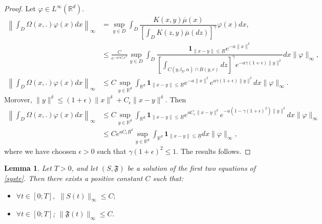 \documentclass[notitlepage,reqno,11pt]{amsart}
\numberwithin{equation}{section}
\newtheorem{lemma}{Lemma}[section]
\def\R{\mathbb{R}}
\begin{document}
\begin{proof}
Let $\varphi \in L^{\infty} (\mathbb{R}^d)$.
\begin{align*}
\left\|\int_{D} \Omega(x,.)\varphi(x)dx\right\|_{\infty}&=\sup_{y\in D} \int_{D}\dfrac{K(x,y)\overline{\mu}(x)}{\left[\displaystyle\int_{D}K(z,y)\overline{\mu}(dz) \right]^{\gamma}}\varphi(x)dx,\\
&\leq \frac{C}{e^{-a\gamma C_\epsilon r^{\delta}}}\sup_{y\in D}\int_{D}  \dfrac{\mathbf{1}_{\|x-y\|\leq \underline{R}}e^{-a\|x\|^{\delta}}}{\left[\displaystyle\int_{C(y,l_y,\alpha)\cap B(y,r)}dz\right]^{\gamma}e^{-a\gamma (1+\epsilon)\|y\|^{\delta}}}dx\|\varphi\|_{\infty},\\
\left\|\int_{D} \Omega(x,.)\varphi(x)dx\right\|_{\infty}&\leq C\sup_{y\in \R^d}\int_{\R^d}  \mathbf{1}_{\|x-y\|\leq \underline{R}}e^{-a\|x\|^{\delta}}e^{a\gamma (1+\epsilon)\|y\|^{\delta}}dx\|\varphi\|_{\infty}.
\end{align*}
Morover, $\|y\|^{\delta} \leq  (1+\epsilon) \|x\|^{\delta} + C_{\epsilon}\|x-y\|^{\delta}$. Then
\begin{align*}
\left\|\int_{D} \Omega(x,.)\varphi(x)dx\right\|_{\infty}&\leq C\sup_{y\in \R^d}\int_{\R^d}  \mathbf{1}_{\|x-y\|\leq \underline{R}}e^{aC_{\epsilon}\|x-y\|^{\delta}}e^{-a\left(1-\gamma (1+\epsilon)^2\right)\|y\|^{\delta}} dx\|\varphi\|_{\infty}\\
&\leq Ce^{aC_{\epsilon}\underline{R}^{\delta}}\sup_{y\in \R^d}  \int_{\R^d} \mathbf{1}_{\|x-y\|\leq \underline{R}}dx\|\varphi\|_{\infty},
\end{align*}
where we have choosen $\epsilon>0$ such that $\gamma(1+\epsilon)^2\leq 1$. The results follows.
\end{proof}
\begin{lemma}
	\label{lem3}
	Let $T>0$, and let $(S,\mathfrak{F} )$  be a solution of the first two equations of \eqref{syste}. Then there exists a positive constant $C$ such that:
	\begin{itemize}
		\item $\forall t\in[0;T],$ $\|S(t)\|_{\infty}\leq C;$
		\item $\forall t\in[0;T]$; $\|\mathfrak{F}(t)\|_{\infty}\leq C.$
	\end{itemize}
\end{lemma}
\end{document}
